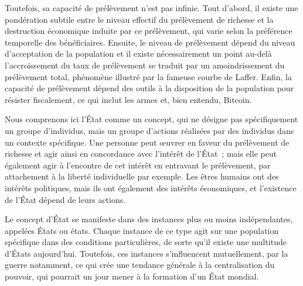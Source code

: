 Toutefois, sa capacité de prélèvement n'est pas infinie. Tout d'abord, il existe une pondération subtile entre le niveau effectif du prélèvement de richesse et la destruction économique induite par ce prélèvement, qui varie selon la préférence temporelle des bénéficiaires. Ensuite, le niveau de prélèvement dépend du niveau d'acceptation de la population et il existe nécessairement un point au-delà l'accroissement du taux de prélèvement se traduit par un amoindrissement du prélèvement total, phénomène illustré par la fameuse courbe de Laffer. Enfin, la capacité de prélèvement dépend des outils à la disposition de la population pour résister fiscalement, ce qui inclut les armes et, bien entendu, Bitcoin.

Nous comprenons ici l'État comme un concept, qui ne désigne pas spécifiquement un groupe d'individus, mais un groupe d'actions réalisées par des individus dans un contexte spécifique. Une personne peut œuvrer en faveur du prélèvement de richesse et agir ainsi en concordance avec l'intérêt de l'État~; mais elle peut également agir à l'encontre de cet intérêt en entravant le prélèvement, par attachement à la liberté individuelle par exemple. Les êtres humains ont des intérêts politiques, mais ils ont également des intérêts économiques, et l'existence de l'État dépend de leurs actions. %

Le concept d'État se manifeste dans des instances plus ou moins indépendantes, appelées États ou états. Chaque instance de ce type agit sur une population spécifique dans des conditions particulières, de sorte qu'il existe une multitude d'États aujourd'hui. Toutefois, ces instances s'influencent mutuellement, par la guerre notamment, ce qui crée une tendance générale à la centralisation du pouvoir, qui pourrait un jour mener à la formation d'un État mondial.

